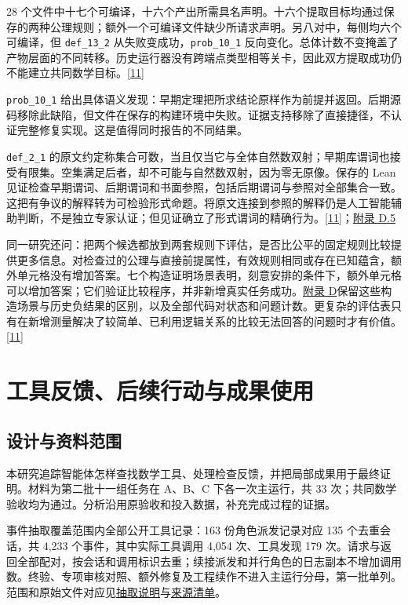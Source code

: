 28 个文件中十七个可编译，十六个产出所需具名声明。十六个提取目标均通过保存的两种公理规则；额外一个可编译文件缺少所请求声明。另八对中，每侧均六个可编译，但 \nolinkurl{def_13_2} 从失败变成功，\nolinkurl{prob_10_1} 反向变化。总体计数不变掩盖了产物层面的不同转移。历史运行器没有跨端点类型相等关卡，因此双方提取成功仍不能建立共同数学目标。\href{zh.pdf\#ref-11}{\mbox{[11]}}

\nolinkurl{prob_10_1} 给出具体语义发现：早期定理把所求结论原样作为前提并返回。后期源码移除此缺陷，但文件在保存的构建环境中失败。证据支持移除了直接捷径，不认证完整修复实现。这是值得同时报告的不同结果。

\nolinkurl{def_2_1} 的原文约定称集合可数，当且仅当它与全体自然数双射；早期库谓词也接受有限集。空集满足后者，却不可能与自然数双射，因为零无原像。保存的 Lean 见证检查早期谓词、后期谓词和书面参照，包括后期谓词与参照对全部集合一致。这把有争议的解释转为可检验形式命题。将原文连接到参照的解释仍是人工智能辅助判断，不是独立专家认证；但见证确立了形式谓词的精确行为。\href{zh.pdf\#ref-11}{\mbox{[11]}}；\href{zh-appendix.pdf\#d5}{附录 D.5}

同一研究还问：把两个候选都放到两套规则下评估，是否比公平的固定规则比较提供更多信息。对检查过的公理与直接前提属性，有效规则相同或存在已知蕴含，额外单元格没有增加答案。七个构造证明场景表明，刻意安排的条件下，额外单元格可以增加答案；它们验证比较程序，并非新增真实任务成功。\href{zh-appendix.pdf\#appendix-d}{附录 D}保留这些构造场景与历史负结果的区别，以及全部代码对状态和问题计数。更复杂的评估表只有在新增测量解决了较简单、已利用逻辑关系的比较无法回答的问题时才有价值。\href{zh.pdf\#ref-11}{\mbox{[11]}}

\section[工具反馈、后续行动与成果使用]{\texorpdfstring{\protect\hypertarget{appendix-s}{}工具反馈、后续行动与成果使用}{工具反馈、后续行动与成果使用}}
\subsection[设计与资料范围]{\texorpdfstring{\protect\hypertarget{s1}{}设计与资料范围}{设计与资料范围}}
本研究追踪智能体怎样查找数学工具、处理检查反馈，并把局部成果用于最终证明。材料为第二批十一组任务在 A、B、C 下各一次主运行，共 33 次；共同数学验收均为通过。分析沿用原验收和投入数据，补充完成过程的证据。

事件抽取覆盖范围内全部公开工具记录：163 份角色派发记录对应 135 个去重会话，共 4,233 个事件，其中实际工具调用 4,054 次、工具发现 179 次。请求与返回全部配对，按会话和调用标识去重；续接派发和并行角色的日志副本不增加调用数。终验、专项审核对照、额外修复及工程续作不进入主运行分母，第一批单列。范围和原始文件对应见\href{research/extraction/README.zh-CN.md}{抽取说明}与\href{research/extraction/source_manifest.json}{来源清单}。

